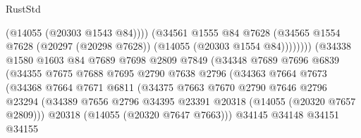 \begin{lexlean}{RustStd}
\begin{coremodule}
                                          (@14055 (@20303 @1543 @84))))
                                      (@34561
                                        @1555
                                        @84
                                        @7628
                                        (@34565
                                          @1554
                                          @7628
                                          (@20297 (@20298 @7628))
                                          (@14055 (@20303 @1554 @84))))))))
                              (@34338
                                @1580
                                @1603
                                @84
                                @7689
                                @7698
                                @2809
                                @7849
                                (@34348
                                  @7689
                                  @7696
                                  @6839
                                  (@34355
                                    @7675
                                    @7688
                                    @7695
                                    @2790
                                    @7638
                                    @2796
                                    (@34363
                                      @7664
                                      @7673
                                      (@34368
                                        @7664
                                        @7671
                                        @6811
                                        (@34375
                                          @7663
                                          @7670
                                          @2790
                                          @7646
                                          @2796
                                          @23294
                                          (@34389
                                            @7656
                                            @2796
                                            @34395
                                            @23391
                                            @20318
                                            (@14055 (@20320 @7657 @2809)))
                                          @20318
                                          (@14055 (@20320 @7647 @7663)))
                                        @34145
                                        @34148
                                        @34151
                                        @34155

\end{coremodule}
\end{lexlean}
